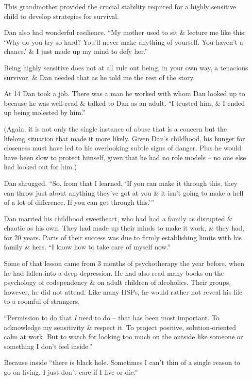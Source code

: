 \documentclass{article}
\numberwithin{equation}{section}
\begin{document}
This grandmother provided the crucial stability required for a highly sensitive child to develop strategies for survival.

Dan also had wonderful resilience. ``My mother used to sit \& lecture me like this: `Why do you try so hard? You'll never make anything of yourself. You haven't a chance.' \& I just made up my mind to defy her.''

Being highly sensitive does not at all rule out being, in your own way, a tenacious survivor. \& Dan needed that as he told me the rest of the story.

At 14 Dan took a job. There was a man he worked with whom Dan looked up to because he was well-read \& talked to Dan as an adult. ``I trusted him, \& I ended up being molested by him.''

(Again, it is not only the single instance of abuse that is a concern but the lifelong situation that made it more likely. Given Dan's childhood, his hunger for closeness must have led to his overlooking subtle signs of danger. Plus he would have been slow to protect himself, given that he had no role models -- no one else had looked out for him.)

Dan shrugged. ``So, from that I learned, `If you can make it through this, they can throw just about anything they've got at you \& it isn't going to make a hell of a lot of difference. If you can get through this.'''

Dan married his childhood sweetheart, who had had a family as disrupted \& chaotic as his own. They had made up their minds to make it work, \& they had, for 20 years. Parts of their success was due to firmly establishing limits with his family \& hers. ``I know how to take care of myself now.''

Some of that lesson came from 3 months of psychotherapy the year before, when he had fallen into a deep depression. He had also read many books on the psychology of codependency \& on adult children of alcoholics. Their groups, however, he did not attend. Like many HSPs, he would rather not reveal his life to a roomful of strangers.

``Permission to do that \textit{I} need to do -- that has been most important. To acknowledge my sensitivity \& respect it. To project positive, solution-oriented calm at work. But to watch for looking too much on the outside like someone or something I don't feel inside.''

Because inside ``there is black hole. Sometimes I can't thin of a single reason to go on living. I just don't care if I live or die.''
\end{document}

